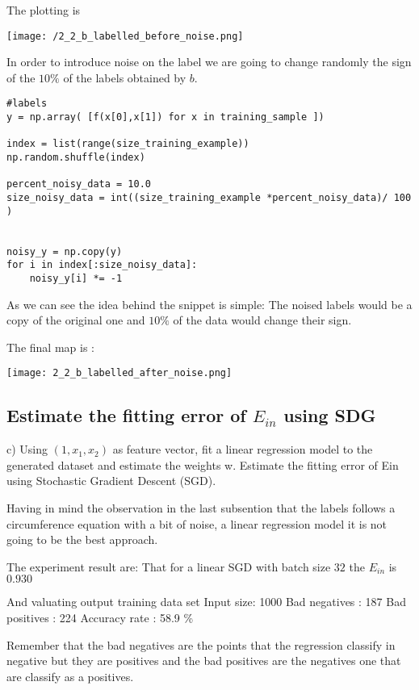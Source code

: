 The plotting is

\texttt{[image: /2\_2\_b\_labelled\_before\_noise.png]}

In order to introduce noise on the label we are going to change randomly the sign of the $10\%$ of  the labels obtained by $b$.



\begin{verbatim}
#labels 
y = np.array( [f(x[0],x[1]) for x in training_sample ])

index = list(range(size_training_example))
np.random.shuffle(index)

percent_noisy_data = 10.0
size_noisy_data = int((size_training_example *percent_noisy_data)/ 100 )


noisy_y = np.copy(y)
for i in index[:size_noisy_data]:
    noisy_y[i] *= -1

  \end{verbatim}

  As we can see the idea behind the snippet is simple: The noised labels would be a copy of the original one and $10\%$ of the data would change their sign.

  The final map is :


  \texttt{[image: 2\_2\_b\_labelled\_after\_noise.png]}
  

  \subsection{ Estimate the fitting error of $E_{in}$ using SDG}

  c) Using $(1, x_1, x_2)$ as feature vector, fit a linear regression model to the generated dataset and estimate the weights w. Estimate the fitting error of Ein using Stochastic Gradient Descent (SGD).

  Having in mind the observation in the last subsention that the labels follows a circumference equation with a bit of noise, a linear regression model it is not going to be the best approach.

  The experiment result are:
That for a linear SGD with batch size $32$ the $E_{in}$ is   $0.930$

And valuating output training data set
Input size:  1000
Bad negatives : 187
Bad positives : 224
Accuracy rate : 58.9 \%


Remember that the bad negatives are the points that the regression classify in negative but they are positives and the bad positives are the negatives one that are classify as a positives.


